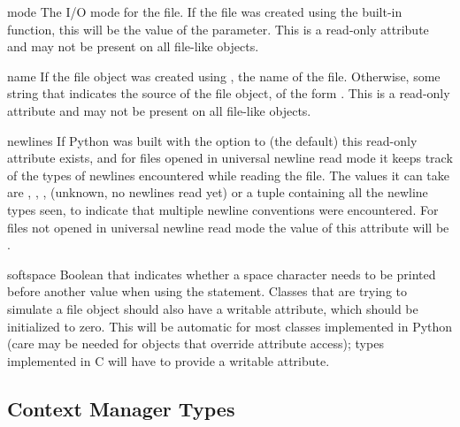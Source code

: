 \begin{memberdesc}[file]{mode}
The I/O mode for the file.  If the file was created using the
 built-in function, this will be the value of the
 parameter.  This is a read-only attribute and may not be
present on all file-like objects.
\end{memberdesc}

\begin{memberdesc}[file]{name}
If the file object was created using , the name of
the file.  Otherwise, some string that indicates the source of the
file object, of the form \samp{<\mbox{\ldots}>}.  This is a read-only
attribute and may not be present on all file-like objects.
\end{memberdesc}

\begin{memberdesc}[file]{newlines}
If Python was built with the 
option to  (the default) this read-only attribute
exists, and for files opened in
universal newline read mode it keeps track of the types of newlines
encountered while reading the file. The values it can take are
, , ,  (unknown,
no newlines read yet) or a tuple containing all the newline
types seen, to indicate that multiple
newline conventions were encountered. For files not opened in universal
newline read mode the value of this attribute will be .
\end{memberdesc}

\begin{memberdesc}[file]{softspace}
Boolean that indicates whether a space character needs to be printed
before another value when using the  statement.
Classes that are trying to simulate a file object should also have a
writable  attribute, which should be initialized to
zero.  This will be automatic for most classes implemented in Python
(care may be needed for objects that override attribute access); types
implemented in C will have to provide a writable
 attribute.
\end{memberdesc}


\subsection{Context Manager Types \label{typecontextmanager}}

